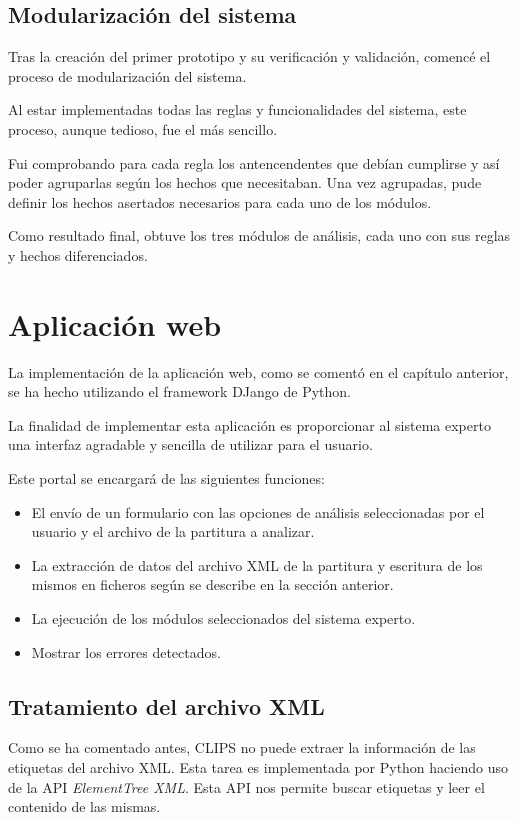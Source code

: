 \subsection{Modularización del sistema}

Tras la creación del primer prototipo y su verificación y validación, comencé el proceso de modularización del sistema. 

Al estar implementadas todas las reglas y funcionalidades del sistema, este proceso, aunque tedioso, fue el más sencillo. 

Fui comprobando para cada regla los antencendentes que debían cumplirse y así poder agruparlas según los hechos que necesitaban.
Una vez agrupadas, pude definir los hechos asertados necesarios para cada uno de los módulos.

Como resultado final, obtuve los tres módulos de análisis, cada uno con sus reglas y hechos diferenciados. 

\section{Aplicación web}

La implementación de la aplicación web, como se comentó en el capítulo anterior, se ha hecho utilizando el framework DJango de Python.

La finalidad de implementar esta aplicación es proporcionar al sistema experto una interfaz agradable y sencilla de utilizar para el usuario. 

Este portal se encargará de las siguientes funciones:
\begin{itemize} 
	\item El envío de un formulario con las opciones de análisis seleccionadas por el usuario y el archivo de la partitura a analizar.
	\item La extracción de datos del archivo XML de la partitura y escritura de los mismos en ficheros según se describe en la sección anterior.
	\item La ejecución de los módulos seleccionados del sistema experto.
	\item Mostrar los errores detectados.
\end{itemize}

\subsection{Tratamiento del archivo XML}

Como se ha comentado antes, CLIPS no puede extraer la información de las etiquetas del archivo XML. Esta tarea es implementada por Python haciendo uso de la API \textit{ElementTree XML}. Esta API nos permite buscar etiquetas y leer el contenido de las mismas. 


